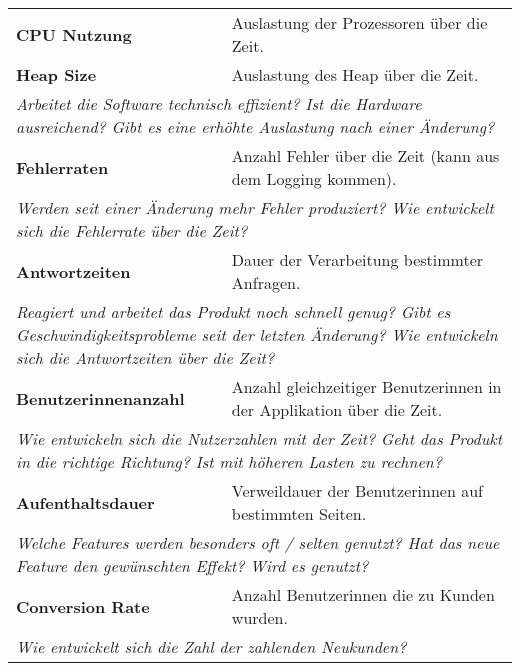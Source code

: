   \begin{table}[H]
    \centering
    \begin{tabular}{p{5cm}p{9.5cm}} \toprule
    \textbf{CPU Nutzung} & Auslastung der Prozessoren über die Zeit. \\
    \textbf{Heap Size} & Auslastung des Heap über die Zeit. \\
    \multicolumn{2}{p{14.5cm}}{\textit{Arbeitet die Software technisch effizient? \newline Ist die Hardware ausreichend? \newline Gibt es eine erhöhte Auslastung nach einer Änderung?}} \\ \midrule
    \textbf{Fehlerraten} & Anzahl Fehler über die Zeit (kann aus dem Logging kommen). \\
    \multicolumn{2}{p{14.5cm}}{\textit{Werden seit einer Änderung mehr Fehler produziert? \newline Wie entwickelt sich die Fehlerrate über die Zeit?}} \\ \midrule
    \textbf{Antwortzeiten} & Dauer der Verarbeitung bestimmter Anfragen. \\
    \multicolumn{2}{p{14.5cm}}{\textit{Reagiert und arbeitet das Produkt noch schnell genug? \newline Gibt es Geschwindigkeitsprobleme seit der letzten Änderung? \newline Wie entwickeln sich die Antwortzeiten über die Zeit?}} \\ \midrule
    \textbf{Benutzerinnenanzahl} & Anzahl gleichzeitiger Benutzerinnen in der Applikation über die Zeit. \\
    \multicolumn{2}{p{14.5cm}}{\textit{Wie entwickeln sich die Nutzerzahlen mit der Zeit? \newline Geht das Produkt in die richtige Richtung? \newline Ist mit höheren Lasten zu rechnen?}} \\ \midrule
    \textbf{Aufenthaltsdauer} & Verweildauer der Benutzerinnen auf bestimmten Seiten. \\
    \multicolumn{2}{p{14.5cm}}{\textit{Welche Features werden besonders oft / selten genutzt? \newline Hat das neue Feature den gewünschten Effekt? Wird es genutzt?}} \\ \midrule
    \textbf{Conversion Rate} & Anzahl Benutzerinnen die zu Kunden wurden. \\
    \multicolumn{2}{p{14.5cm}}{\textit{Wie entwickelt sich die Zahl der zahlenden Neukunden?}} \\ \midrule

\end{tabular}
\end{table}

